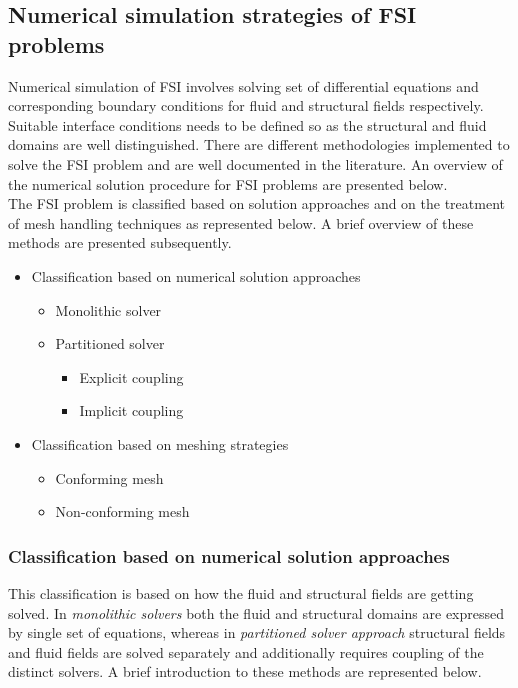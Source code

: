 \subsection{Numerical simulation strategies of FSI problems}
Numerical simulation of FSI involves solving set of differential equations and corresponding boundary conditions for fluid and structural fields respectively. Suitable interface conditions needs to be defined so as the structural and fluid domains are well distinguished. There are different methodologies implemented to solve the FSI problem and are well documented in the literature. An overview of the numerical solution procedure for FSI problems are presented below.\\
The FSI problem is classified based on solution approaches and on the treatment of mesh handling techniques as represented below. A brief overview of these methods are presented subsequently.

\begin{itemize}
 \item{Classification based on numerical solution approaches}
 \begin{itemize}
 \item{Monolithic solver}
 \item{Partitioned solver}
 \begin{itemize}
 \item{Explicit coupling}
 \item{Implicit coupling}
 \end{itemize}
 \end{itemize}
 \item{Classification based on meshing strategies}
 \begin{itemize}
 \item{Conforming mesh}
 \item{Non-conforming mesh}
 \end{itemize}
\end{itemize} 

\subsubsection*{Classification based on numerical solution approaches}
This classification is based on how the fluid and structural fields are getting solved. In \textit{monolithic solvers} both the fluid and structural domains are expressed by single set of equations, whereas in \textit{partitioned solver approach} structural fields and fluid fields are solved separately and additionally requires coupling of the distinct solvers. A brief introduction to these methods are represented below.    

